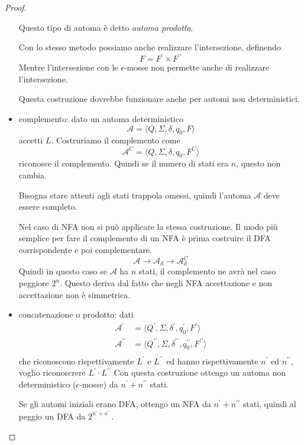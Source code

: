 \documentclass[12pt]{article}
\begin{document}
\begin{proof}
\begin{itemize}
			Questo tipo di automa è detto \textit{automa prodotto}.

			Con lo stesso metodo possiamo anche realizzare l'intersezione, definendo 
			$$ F = F^\prime \times F^{\prime\prime} $$
			Mentre l'intersezione con le $\epsilon$-mosse non permette anche di realizzare l'intersezione.

			Questa costruzione dovrebbe funzionare anche per automi non deterministici. %
		\item complemento: dato un automa deterministico 
			$$\mathcal{A} = \langle Q, \Sigma, \delta, q_0, F \rangle $$
			accetti $L$.
			Costruriamo il complemento come
			$$ \mathcal{A}^C = \langle Q, \Sigma, \delta, q_0, F^C \rangle $$
			riconosce il complemento.
			Quindi se il numero di stati era $n$, questo non cambia.

			Bisogna stare attenti agli stati trappola omessi, quindi l'automa $\mathcal{A}$ deve essere completo.

			Nel caso di NFA non si può applicare la stessa costruzione.
			Il modo più semplice per fare il complemento di un NFA è prima costruire il DFA corrispondente e poi complementare.
			$$ \mathcal{A} \rightarrow \mathcal{A}_d \rightarrow \mathcal{A}^C_d $$
			Quindi in questo caso se $\mathcal{A}$ ha $n$ stati, il complemento ne avrà nel caso peggiore $2^n$.
			Questo deriva dal fatto che negli NFA accettazione e non accettazione non è simmetrica.
		\item concatenazione o prodotto: dati 
			\begin{align*}
				\mathcal{A}^\prime &= \langle Q^\prime, \Sigma, \delta^\prime, q_0^\prime, F^\prime \rangle \\
				\mathcal{A}^{\prime\prime} &= \langle Q^{\prime\prime}, \Sigma, \delta^{\prime\prime}, q_0^{\prime\prime}, F^{\prime\prime} \rangle \\
			\end{align*}
			che riconoscono rispettivamente $L^\prime$ e $L^{\prime\prime}$ ed hanno rispettivamente $n^\prime$ ed $n^{\prime\prime}$, voglio riconoscrere $L^\prime \cdot L^{\prime\prime}$
			Con questa costruzione ottengo un automa non deterministico ($\epsilon$-mosse) da $n^\prime + n^{\prime\prime}$ stati.

			Se gli automi iniziali erano DFA, ottengo un NFA da $n^\prime + n^{\prime\prime}$ stati, quindi al peggio un DFA da $2^{n^\prime + n^{\prime\prime}}$.
			

\end{itemize}
\end{proof}
\end{document}
